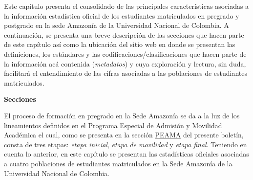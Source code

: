 \documentclass[
]{book}
\begin{document}
Este capítulo presenta el consolidado de las principales características asociadas a la información estadística oficial de los estudiantes matriculados en pregrado y postgrado en la sede Amazonía de la Universidad Nacional de Colombia. A continuación, se presenta una breve descripción de las secciones que hacen parte de este capítulo así como la ubicación del sitio web en donde se presentan las definiciones, los estándares y las codificaciones/clasificaciones que hacen parte de la información acá contenida (\emph{metadatos}) y cuya exploración y lectura, sin duda, facilitará el entendimiento de las cifras asociadas a las poblaciones de estudiantes matriculados.

\textbf{Secciones}

El proceso de formación en pregrado en la Sede Amazonía se da a la luz de los lineamientos definidos en el Programa Especial de Admisión y Movilidad Académica el cual, como se presenta en la sección \protect\hyperlink{peama}{PEAMA} del presente boletín, consta de tres etapas: \emph{etapa inicial}, \emph{etapa de movilidad} y \emph{etapa final}. Teniendo en cuenta lo anterior, en este capítulo se presentan las estadísticas oficiales asociadas a cuatro poblaciones de estudiantes matriculados en la Sede Amazonía de la Universidad Nacional de Colombia.
\end{document}
